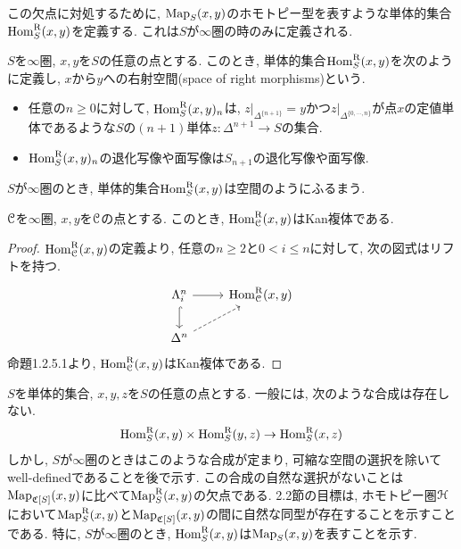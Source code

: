 \documentclass[uplatex, a4paper, 14Q, dvipdfmx]{jsreport}
\begin{document}
この欠点に対処するために,  $\mathrm{Map}_S(x,y)$のホモトピー型を表すような単体的集合$\mathrm{Hom}^{\mathrm{R}}_S(x,y)$を定義する. 
これは$S$が$\infty$圏の時のみに定義される. 

$S$を$\infty$圏, $x,y$を$S$の任意の点とする. 
このとき, 単体的集合$\mathrm{Hom}^{\mathrm{R}}_S(x,y)$を次のように定義し, $x$から$y$への右射空間(space of right morphisms)という. 
\begin{itemize}
  \item 任意の$n \geq 0$に対して, $\mathrm{Hom}^{\mathrm{R}}_S(x,y)_n$は, $z|_{\Delta^{\{n+1\}}} = y$かつ$z|_{\Delta^{\{0,\cdots,n\}}}$が点$x$の定値単体であるような$S$の$(n+1)$単体$z : \Delta^{n+1} \to S$の集合.
  \item $\mathrm{Hom}^{\mathrm{R}}_S(x,y)_n$の退化写像や面写像は$S_{n+1}$の退化写像や面写像.
\end{itemize}
$S$が$\infty$圏のとき, 単体的集合$\mathrm{Hom}^{\mathrm{R}}_S(x,y)$は空間のようにふるまう. 

\begin{proposition} \label{prop.1.2.2.3}
  $\mathcal{C}$を$\infty$圏, $x,y$を$\mathcal{C}$の点とする. 
  このとき, $\mathrm{Hom}^{\mathrm{R}}_{\mathcal{C}}(x,y)$はKan複体である.
\end{proposition}

\begin{proof}
  $\mathrm{Hom}^{\mathrm{R}}_{\mathcal{C}}(x,y)$の定義より, 任意の$n \geq 2$と$0 < i \leq n$に対して, 次の図式はリフトを持つ. 
  \[\begin{tikzcd}
    {\Lambda^n_i} & {\Hom^\R_\C(x,y)} \\
    {\Delta^n}
    \arrow[from=1-1, to=1-2]
    \arrow[hook, from=1-1, to=2-1]
    \arrow[dashed, from=2-1, to=1-2]
  \end{tikzcd}\]
  命題1.2.5.1より, $\mathrm{Hom}^{\mathrm{R}}_{\mathcal{C}}(x,y)$はKan複体である.
\end{proof}

\begin{remark} \label{rem.1.2.2.4}
  $S$を単体的集合, $x,y,z$を$S$の任意の点とする. 
  一般には, 次のような合成は存在しない. 
  \begin{align*}
    \mathrm{Hom}^{\mathrm{R}}_S(x,y) \times \mathrm{Hom}^{\mathrm{R}}_S(y,z) \to \mathrm{Hom}^{\mathrm{R}}_S(x,z)
  \end{align*}
  しかし, $S$が$\infty$圏のときはこのような合成が定まり, 可縮な空間の選択を除いてwell-definedであることを後で示す. 
  この合成の自然な選択がないことは$\mathrm{Map}_{\mathfrak{C}[S]}(x,y)$に比べて$\mathrm{Map}^{\mathrm{R}}_S(x,y)$の欠点である. 
  2.2節の目標は, ホモトピー圏$\mathcal{H}$において$\mathrm{Map}^{\mathrm{R}}_S(x,y)$と$\mathrm{Map}_{\mathfrak{C}[S]}(x,y)$の間に自然な同型が存在することを示すことである. 
  特に, $S$が$\infty$圏のとき, $\mathrm{Hom}^{\mathrm{R}}_S(x,y)$は$\mathrm{Map}_S(x,y)$を表すことを示す. 
\end{remark}
\end{document}

